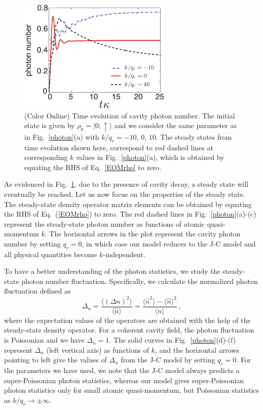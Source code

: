 \documentclass[atoms,article,submit,moreauthors,pdftex,12pt,a4paper]{mdpi}
\begin{document}
\begin{figure}[htp]
\includegraphics[width=0.65\textwidth]{photon_evolution}\caption{(Color Online) Time evolution of cavity photon number. The initial state is given by $\rho_0=|0;\uparrow\rangle$ and we consider the same parameter as in Fig.~\ref{photon}(a) with $k/q_r=-10,\,0,\,10$. The steady states from time evolution shown here, correspond to red dashed lines at corresponding $k$ values in Fig.~\ref{photon}(a), which is obtained by equating the RHS of Eq.~\ref{EOMrho} to zero. }\label{evo}
\end{figure}

As evidenced in Fig.~\ref{evo}, due to the presence of cavity decay, a steady state will eventually be reached. Let us now focus on the properties of the steady state. The steady-state density operator matrix elements can be obtained by equating the RHS of Eq.~(\ref{EOMrho}) to zero. The red dashed lines in Fig.~\ref{photon}(a)-(c) represent the steady-state photon number as functions of atomic quasi-momentum $k$. The horizontal arrows in the plot represent the cavity photon number by setting $q_r=0$, in which case our model reduces to the J-C model and all physical quantities become $k$-independent. 

To have a better understanding of the photon statistics, we study the steady-state photon number fluctuation. Specifically, we calculate the normalized photon fluctuation defined as 
\[\Delta_n = \frac{\langle(\Delta n)^{2}\rangle}{\langle \hat{n}\rangle}=\frac{\langle \hat{n}^{2}\rangle-\langle \hat{n}\rangle^{2}}{\langle n\rangle} \,,\] 
where the expectation values of the operators are obtained with the help of the steady-state density operator. For a coherent cavity field, the photon fluctuation is Poissonian and we have $\Delta_n=1$.
The solid curves in Fig.~\ref{photon}(d)-(f) represent $\Delta_n$ (left vertical axis) as functions of $k$, and the horizontal arrows pointing to left give the values of $\Delta_n$ from the J-C model by setting $q_r=0$. For the parameters we have used, we note that the J-C model always predicts a super-Poissonian photon statistics, whereas our model gives super-Poissonian photon statistics only for small atomic quasi-momentum, but Poissonian statistics as $k/q_r \longrightarrow \pm \infty$. 
\end{document}
